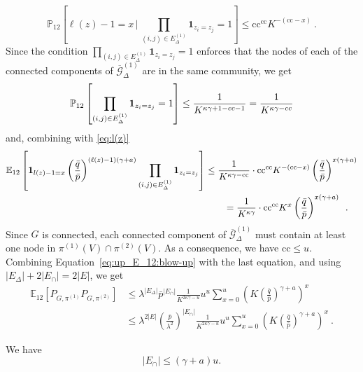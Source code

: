 \documentclass[final]{colt2026}
\newcommand{\1}{\mathbf{1}}
\newcommand{\bbE}{\mathbb{E}}
\newcommand{\cro}[1]{\left[#1\right]}
\begin{document}
\begin{equation}\label{eq:l(z)}
\mathbb{P}_{12}\cro{\ell(z)-1= x\,\Bigg|\, \prod_{(i,j)\in E^{(1)}_{\Delta}}\mathbf 1_{z_{i}=z_{j}}=1}\leq \mathrm{cc}^{\mathrm{cc}} K^{-(\mathrm{cc}-x)} \ . 
\end{equation}
Since the condition $\prod_{(i,j)\in E^{(1)}_{\Delta}}\mathbf 1_{z_{i}=z_{j}}=1$ enforces that the nodes of each of the connected components of $\overline{\mathcal{G}}^{(1)}_{\Delta}$ are in the same community, we get
$$\mathbb{P}_{12}\cro{\prod_{(i,j)\in E^{(1)}_{\Delta}}\mathbf 1_{z_{i}=z_{j}}=1}\leq {1\over K^{\kappa\gamma+1-cc-1}}={1\over K^{\kappa\gamma-cc}}$$
and, combining with \eqref{eq:l(z)}
\begin{align*}
    \bbE_{12}\cro{\mathbf 1_{l(z)-1 = x}\left({\bar q \over \bar p}\right)^{(\ell(z)-1)(\gamma + a)} \prod_{(i,j)\in E^{(1)}_{\Delta}}\mathbf 1_{z_{i}=z_{j}}} &\leq  \frac{1}{K^{\kappa \gamma -\mathrm{cc}}}  \cdot \mathrm{cc}^{\mathrm{cc}} K^{-(\mathrm{cc}-x)} \left(\frac{\bar q }{\bar p}\right)^{x (\gamma +a)}\\ 
    &\quad\quad = \frac{1}{K^{\kappa \gamma }}  \cdot \mathrm{cc}^{\mathrm{cc}} K^{x} \left(\frac{\bar q }{\bar p}\right)^{x (\gamma +a)}\enspace .
\end{align*}    
Since $G$ is connected,  each connected component of $\overline{\mathcal{G}}^{(1)}_{\Delta}$ must contain at least one node in $\pi^{(1)}(V)\cap \pi^{(2)}(V)$. As a consequence, we have $\mathrm{cc}\leq u$. Combining Equation~\eqref{eq:up_E_12:blow-up} with the last equation, and using  $|E_{\Delta}|+ 2|E_{\cap}|= 2|E|$, we get 
\begin{align*}
\bbE_{12}\cro{P_{G,\pi^{(1)}}P_{G,\pi^{(2)}}} %
  & \leq \lambda^{|E_{\Delta}|}\bar p^{|E_{\cap}|}\frac{1}{K^{2\kappa \gamma-u}} 
  u^u \sum_{x = 0 }^{u} \left(K \left(\frac{\bar q }{\bar p}\right)^{\gamma +a}\right)^{x }\ \\
  & \leq \lambda^{2|E|}\left(\frac{\bar p}{\lambda^2}\right)^{|E_{\cap}|}\frac{1}{K^{2\kappa \gamma-u}} 
  u^u \sum_{x = 0 }^{u} \left(K \left(\frac{\bar q }{\bar p}\right)^{\gamma +a}\right)^{x }\ .
\end{align*}
\begin{lemma}\label{lem:cap}
We have 
\[
|E_{\cap}|\leq (\gamma + a ) u.
\]
\end{lemma}
\end{document}
